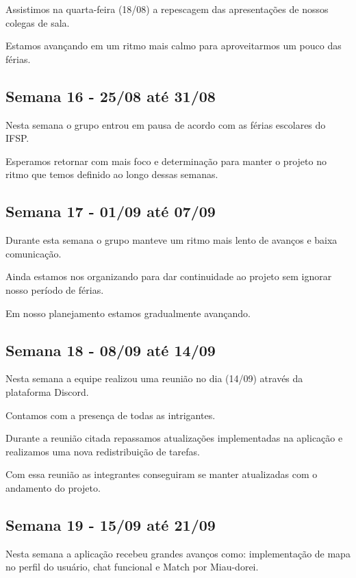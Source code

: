 \begin{apendicesenv}
\begin{flushleft}
Assistimos na quarta-feira (18/08) a repescagem das apresentações de nossos colegas de sala.

Estamos avançando em um ritmo mais calmo para aproveitarmos um pouco das férias.
\end{flushleft}
\begin{flushleft}
 \section{Semana 16 - 25/08 até 31/08}
 Nesta semana o grupo entrou em pausa de acordo com as férias escolares do \ac{IFSP}.

Esperamos retornar com mais foco e determinação para manter o projeto no ritmo que temos definido ao longo dessas semanas.
\end{flushleft}
\begin{flushleft}
 \section{Semana 17 - 01/09 até 07/09}
  Durante esta semana o grupo manteve um ritmo mais lento de avanços e baixa comunicação. 

Ainda estamos nos organizando para dar continuidade ao projeto sem ignorar nosso período de férias.

Em nosso planejamento estamos gradualmente avançando.
\end{flushleft}
\begin{flushleft}
 \section{Semana 18 - 08/09 até 14/09}
  Nesta semana a equipe realizou uma reunião no dia (14/09) através da plataforma \gls{Discord}.

Contamos com a presença de todas as intrigantes.

Durante a reunião citada repassamos atualizações implementadas na aplicação e realizamos uma nova redistribuição de tarefas.

Com essa reunião as integrantes conseguiram se manter atualizadas com o andamento do projeto.
\end{flushleft}
\begin{flushleft}
 \section{Semana 19 - 15/09 até 21/09}
  Nesta semana a aplicação recebeu grandes avanços como: implementação de mapa no perfil do usuário, chat funcional e \gls{Match} por \gls{Miau-dorei}.


\end{flushleft}
\end{apendicesenv}
